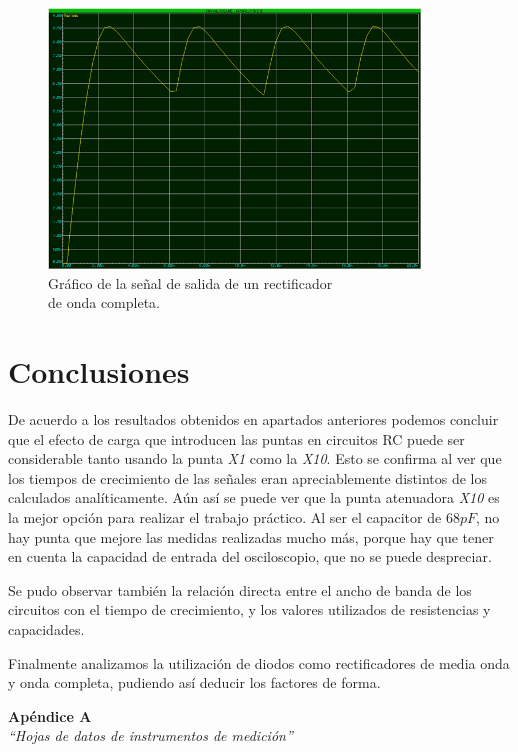 \documentclass{article}
\begin{document}
\newpage
\begin{figure}[h]
	\centering
	\includegraphics[width=0.88\textwidth]{images/4-4-8-grafico-circuito-rectificador-onda-completa-con-filtro.jpg}
	\caption{Gráfico de la señal de salida de un rectificador\\ de onda completa.}
\end{figure}
\bigskip\bigskip




\section{Conclusiones}

	De acuerdo a los resultados obtenidos en apartados anteriores podemos concluir que el efecto de carga que introducen las puntas en circuitos RC puede ser considerable tanto usando la punta \textit{X1} como la \textit{X10}. Esto se confirma al ver que los tiempos de crecimiento de las señales eran apreciablemente distintos de los calculados analíticamente. Aún así se puede ver que la punta atenuadora \textit{X10} es la mejor opción para realizar el trabajo práctico. Al ser el capacitor de $68 pF$, no hay punta que mejore las medidas realizadas mucho más, porque hay que tener en cuenta la capacidad de entrada del osciloscopio, que no se puede despreciar. 
	\par
	Se pudo observar también la relación directa entre el ancho de banda de los circuitos con el tiempo de crecimiento, y los valores utilizados de resistencias y capacidades. 
	\par
	Finalmente analizamos la utilización de diodos como rectificadores de media onda y onda completa, pudiendo así deducir los factores de forma.
\bigskip\bigskip


\newpage \textit{}
\newpage



\newpage
\vspace*{4cm}
\begin{center}
	\textbf{\Huge{Apéndice A}} \\
	\bigskip\bigskip
	\Large{\textit{``Hojas de datos de instrumentos de medición''}}
\end{center}


\newpage \textit{}
\newpage
\end{document}
